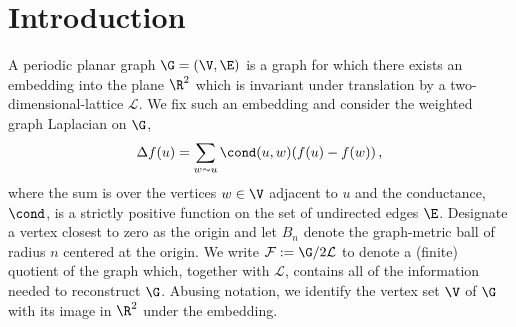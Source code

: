 \section{Introduction}\label{sec:intro}
A periodic planar graph $\G = (\V, \E)$ is a graph for which there exists an embedding into the plane $\R^2$ which is invariant under translation by a two-dimensional-lattice $\mathcal{L}$.
We fix such an embedding and consider the weighted graph Laplacian on $\G$,
\[
\Delta f(u) = \sum_{w \sim u} \cond(u,w)( f(u) - f(w)) \,,
\]
where the sum is over the vertices $w \in \V$ adjacent to $u$ and the conductance, $\cond$, is a strictly positive function on the set of undirected edges $\E$. Designate a vertex closest to zero as the origin and let $B_n$ denote the graph-metric ball of radius $n$ centered at the origin. We write $\mathcal{F} := \G / 2\mathcal{L}$ to denote a (finite) quotient of the graph which, together with $\mathcal{L}$, contains all of the information needed to reconstruct $\G$. Abusing notation, we identify the vertex set $\V$ of $\G$ with its image in $\R^2$ under the embedding.
